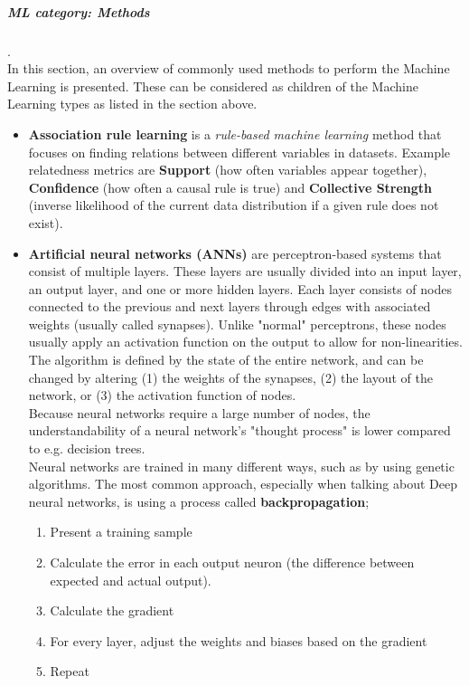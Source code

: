 \subparagraph{ML category: Methods}
.\\
In this section, an overview of commonly used methods to perform the Machine Learning is presented. These can be considered as children of the Machine Learning types as listed in the section above.
\begin{itemize}
	\item \textbf{Association rule learning}
		is a \textit{rule-based machine learning} method that focuses on finding relations between different variables in datasets. Example relatedness metrics are \textbf{Support} (how often variables appear together), \textbf{Confidence} (how often a causal rule is true) and \textbf{Collective Strength} (inverse likelihood of the current data distribution if a given rule does not exist).
	\item \textbf{Artificial neural networks (ANNs)}
		are perceptron-based systems that consist of multiple layers. These layers are usually divided into an input layer, an output layer, and one or more hidden layers. Each layer consists of nodes connected to the previous and next layers through edges with associated weights (usually called synapses). Unlike "normal" perceptrons, these nodes usually apply an activation function on the output to allow for non-linearities.\\
		The algorithm is defined by the state of the entire network, and can be changed by altering (1) the weights of the synapses, (2) the layout of the network, or (3) the activation function of nodes.\\
		Because neural networks require a large number of nodes, the understandability of a neural network's "thought process" is lower compared to e.g. decision trees.\\
		Neural networks are trained in many different ways, such as by using genetic algorithms. The most common approach, especially when talking about Deep neural networks, is using a process called \textbf{backpropagation};
		\begin{enumerate}
			\item Present a training sample
			\item Calculate the error in each output neuron (the difference between expected and actual output).
			\item Calculate the gradient
			\item For every layer, adjust the weights and biases based on the gradient
			\item Repeat
		\end{enumerate}

\end{itemize}
